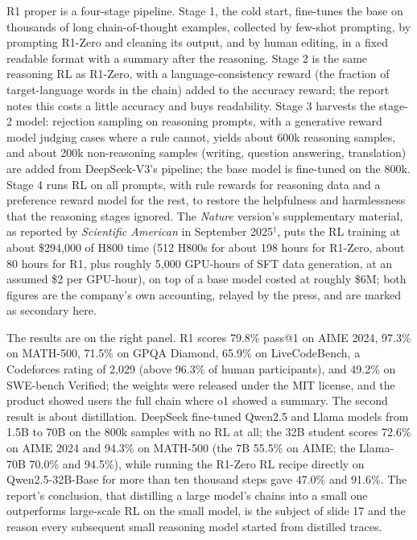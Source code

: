 \documentclass[11pt,letterpaper]{article}
\begin{document}
R1 proper is a four-stage pipeline. Stage 1, the cold start, fine-tunes the base on thousands of long chain-of-thought examples, collected by few-shot prompting, by prompting R1-Zero and cleaning its output, and by human editing, in a fixed readable format with a summary after the reasoning. Stage 2 is the same reasoning RL as R1-Zero, with a language-consistency reward (the fraction of target-language words in the chain) added to the accuracy reward; the report notes this costs a little accuracy and buys readability. Stage 3 harvests the stage-2 model: rejection sampling on reasoning prompts, with a generative reward model judging cases where a rule cannot, yields about 600k reasoning samples, and about 200k non-reasoning samples (writing, question answering, translation) are added from DeepSeek-V3's pipeline; the base model is fine-tuned on the 800k. Stage 4 runs RL on all prompts, with rule rewards for reasoning data and a preference reward model for the rest, to restore the helpfulness and harmlessness that the reasoning stages ignored. The \emph{Nature} version's supplementary material, as reported by \emph{Scientific American} in September 2025$^\dagger$, puts the RL training at about \$294,000 of H800 time (512 H800s for about 198 hours for R1-Zero, about 80 hours for R1, plus roughly 5,000 GPU-hours of SFT data generation, at an assumed \$2 per GPU-hour), on top of a base model costed at roughly \$6M; both figures are the company's own accounting, relayed by the press, and are marked as secondary here.

The results are on the right panel. R1 scores 79.8\% pass@1 on AIME 2024, 97.3\% on MATH-500, 71.5\% on GPQA Diamond, 65.9\% on LiveCodeBench, a Codeforces rating of 2,029 (above 96.3\% of human participants), and 49.2\% on SWE-bench Verified; the weights were released under the MIT license, and the product showed users the full chain where o1 showed a summary. The second result is about distillation. DeepSeek fine-tuned Qwen2.5 and Llama models from 1.5B to 70B on the 800k samples with no RL at all; the 32B student scores 72.6\% on AIME 2024 and 94.3\% on MATH-500 (the 7B 55.5\% on AIME; the Llama-70B 70.0\% and 94.5\%), while running the R1-Zero RL recipe directly on Qwen2.5-32B-Base for more than ten thousand steps gave 47.0\% and 91.6\%. The report's conclusion, that distilling a large model's chains into a small one outperforms large-scale RL on the small model, is the subject of slide 17 and the reason every subsequent small reasoning model started from distilled traces.
\end{document}
